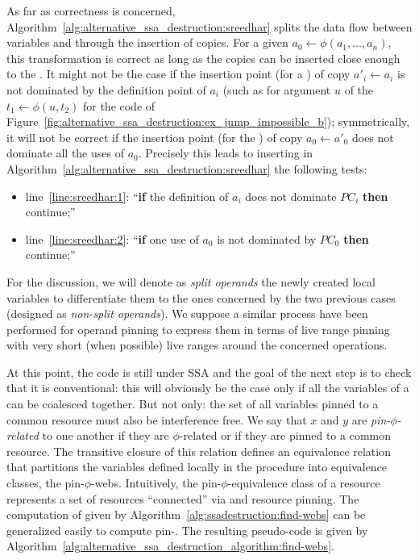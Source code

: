As far as correctness is concerned, Algorithm~\ref{alg:alternative_ssa_destruction:sreedhar} splits the data flow between variables and \phinodes through the insertion of copies. 
For a given \phifun $a_0\gets \phi(a_1,\dots,a_n)$, this transformation is correct as long as the copies can be inserted close enough to the \phifun. 
It might not be the case if the insertion point (for a \useop) of copy $a'_i\gets a_i$ is not dominated by the definition point of $a_i$ (such as for argument $u$ of the \phifun $t_1\gets \phi(u,t_2)$ for the code of Figure~\ref{fig:alternative_ssa_destruction:ex_jump_impossible_b}); 
symmetrically, it will not be correct if the insertion point (for the ) of copy $a_0\gets a'_0$ does not dominate all the uses of $a_0$. 
Precisely this leads to inserting in Algorithm~\ref{alg:alternative_ssa_destruction:sreedhar} the following tests:
\begin{itemize}
\item line~\ref{line:sreedhar:1}: ``{\bf if} the definition of $a_i$ does not dominate $\textit{PC}_i$ {\bf then} continue;''
\item line~\ref{line:sreedhar:2}: ``{\bf if} one use of $a_0$ is not dominated by $\textit{PC}_0$ {\bf then} continue;''
\end{itemize}
For the discussion, we will denote as \emph{split operands} the newly created local variables to differentiate them to the ones concerned by the two previous cases (designed as \emph{non-split operands}).
We suppose a similar process have been performed for operand pinning to express them in terms of live range pinning with very short (when possible) live ranges around the concerned operations. 

At this point, the code is still under SSA and the goal of the next step is to check that it is conventional: 
this will obviously be the case only if all the variables of a \phiweb\index{\phiweb} can be coalesced together. 
But not only: 
the set of all variables pinned to a common resource must also be interference free. 
We say that $x$ and $y$ are \emph{pin-$\phi$-related} to one another if they are $\phi$-related or if they are pinned to a common resource. 
The transitive closure of this relation defines an equivalence relation that partitions the variables defined locally in the procedure into equivalence classes, the pin-$\phi$-webs. 
Intuitively, the pin-$\phi$-equivalence class of a resource represents a set of resources ``connected'' via \phifuns and resource pinning. 
The computation of \phiwebs given by Algorithm~\ref{alg:ssadestruction:find-webs} can be generalized easily to compute pin-\phiwebs. 
The resulting pseudo-code is given by Algorithm~\ref{alg:alternative_ssa_destruction_algorithm:find-webs}.

